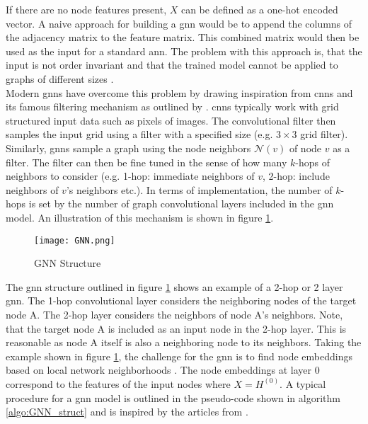 	\noindent If there are no node features present, $X$ can be defined as a 
	one-hot encoded vector. A naive approach for building a \acs{gnn} would be to
	append the columns of the adjacency matrix to the feature matrix. This
	combined matrix would then be used as the input for a standard \acs{ann}. 
	The problem with this approach is, that the input is not order invariant and 
	that the trained model cannot be applied to graphs of different sizes 
	\citep{leskovec2021lecture}. \\

	\noindent Modern \acsp{gnn} have overcome this problem by drawing inspiration 
	from \acp{cnn} and its famous filtering mechanism as outlined by 
	\cite{krizhevsky2012imagenet}. \acsp{cnn} typically work with grid 
	structured input data such as pixels of images. The convolutional filter 
	then samples the input grid using a filter with a specified size 
	(e.g. $3\times3$ grid filter). Similarly, \acsp{gnn} sample a graph using 
	the node neighbors $\mathcal{N}(v)$ of node $v$ as a filter. The filter can 
	then be fine tuned in the sense of how many $k$-hops of neighbors to consider 
	(e.g. 1-hop: immediate neighbors of $v$, 2-hop: include neighbors of $v$'s 
	neighbors etc.). In terms of implementation, the number of $k$-hops is set 
	by the number of graph convolutional layers included in the \acs{gnn} model. 
	An illustration of this mechanism is shown in figure \ref{fig:GNN_structure}. \\

	\begin{figure}[h]
		\centering
		\texttt{[image: GNN.png]}
		\caption{GNN Structure}
		\citep{leskovec2021lecture}
		\label{fig:GNN_structure}
	\end{figure}

	\noindent The \acs{gnn} structure outlined in figure \ref{fig:GNN_structure} 
	shows an example of a 2-hop or 2 layer \acs{gnn}. The 1-hop convolutional layer 
	considers the neighboring nodes of the target node A. The 2-hop layer 
	considers the neighbors of node A's neighbors. Note, that the target node A 
	is included as an input node in the 2-hop layer. This is reasonable as node 
	A itself is also a neighboring node to its neighbors. Taking the example 
	shown in figure \ref{fig:GNN_structure}, the challenge for the \acs{gnn} is to 
	find node embeddings based on local network neighborhoods \citep{leskovec2021lecture}. 
	The node embeddings at layer 0 correspond to the features of the input nodes 
	where $X = H^{(0)}$. A typical procedure for a \acs{gnn} model is outlined 
	in the pseudo-code shown in algorithm \ref{algo:GNN_struct} and is inspired
	by the articles from 
	\cite{hamilton2017inductive,leskovec2021lecture,you2020design}.	


